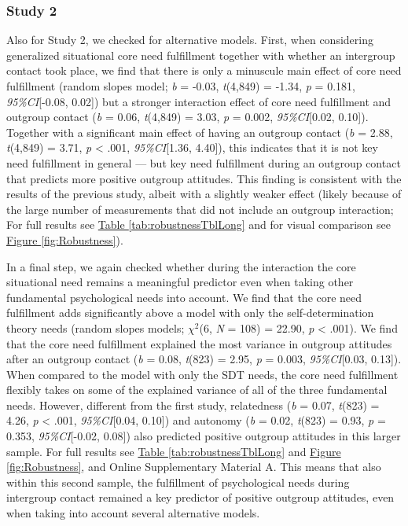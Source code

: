 \documentclass[man, 12pt, a4paper, mask]{apa7}
\theoremstyle{break}
\theoremstyle{plain}
\newcommand{\fgrref}[2][]{\hyperref[#2]{Figure \ref*{#2}#1}}
\newcommand{\tblref}[2][]{\hyperref[#2]{Table \ref*{#2}#1}}
\begin{document}
\subsubsection{Study 2}

Also for Study 2, we checked for alternative models. First, when
considering generalized situational core need fulfillment together with
whether an intergroup contact took place, we find that there is only a
minuscule main effect of core need fulfillment (random slopes model;
\textit{b} = -0.03, \textit{t}(4,849) = -1.34, \textit{p} = 0.181,
\textit{95\%CI}{[}-0.08, 0.02{]}) but a stronger interaction effect of
core need fulfillment and outgroup contact (\textit{b} = 0.06,
\textit{t}(4,849) = 3.03, \textit{p} = 0.002, \textit{95\%CI}{[}0.02,
0.10{]}). Together with a significant main effect of having an outgroup
contact (\textit{b} = 2.88, \textit{t}(4,849) = 3.71, \textit{p}
\textless{} .001, \textit{95\%CI}{[}1.36, 4.40{]}), this indicates that
it is not key need fulfillment in general --- but key need fulfillment
during an outgroup contact that predicts more positive outgroup
attitudes. This finding is consistent with the results of the previous
study, albeit with a slightly weaker effect (likely because of the large
number of measurements that did not include an outgroup interaction; For
full results see \tblref{tab:robustnessTblLong} and for visual
comparison see \fgrref{fig:Robustness}).

In a final step, we again checked whether during the interaction the
core situational need remains a meaningful predictor even when taking
other fundamental psychological needs into account. We find that the
core need fulfillment adds significantly above a model with only the
self-determination theory needs (random slopes models; \(\chi^2\)(6,
\textit{N} = 108) = 22.90, \textit{p} \textless{} .001). We find that
the core need fulfillment explained the most variance in outgroup
attitudes after an outgroup contact (\textit{b} = 0.08, \textit{t}(823)
= 2.95, \textit{p} = 0.003, \textit{95\%CI}{[}0.03, 0.13{]}). When
compared to the model with only the SDT needs, the core need fulfillment
flexibly takes on some of the explained variance of all of the three
fundamental needs. However, different from the first study, relatedness
(\textit{b} = 0.07, \textit{t}(823) = 4.26, \textit{p} \textless{} .001,
\textit{95\%CI}{[}0.04, 0.10{]}) and autonomy (\textit{b} = 0.02,
\textit{t}(823) = 0.93, \textit{p} = 0.353, \textit{95\%CI}{[}-0.02,
0.08{]}) also predicted positive outgroup attitudes in this larger
sample. For full results see \tblref{tab:robustnessTblLong} and
\fgrref{fig:Robustness}, and Online Supplementary Material A. This means
that also within this second sample, the fulfillment of psychological
needs during intergroup contact remained a key predictor of positive
outgroup attitudes, even when taking into account several alternative
models.
\end{document}

